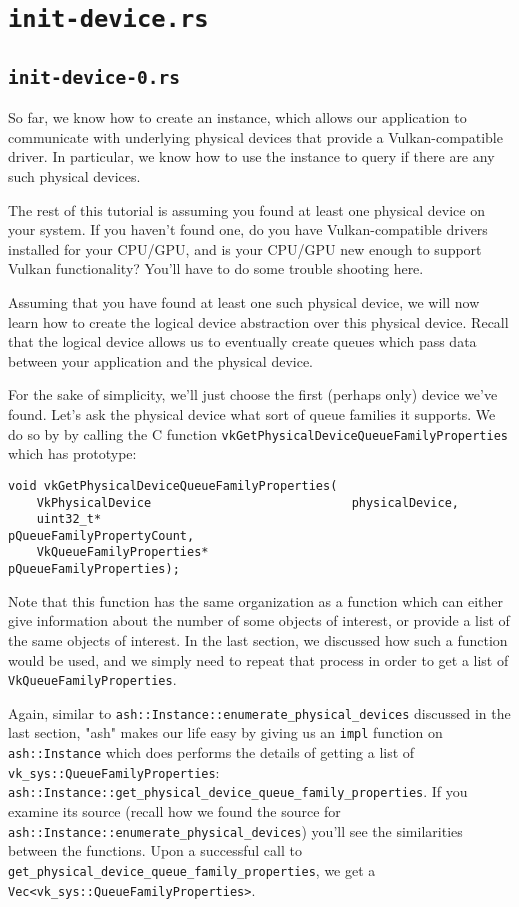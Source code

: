 \documentclass[12pt,letterpaper]{article}
\newcommand{\ril}[1]{\texttt{#1}}
\newcommand{\cil}[1]{\texttt{#1}}
\begin{document}
\section{\texttt{init-device.rs}}
	
	\subsection{\texttt{init-device-0.rs}}
		So far, we know how to create an instance, which allows our application to communicate with underlying physical devices that provide a Vulkan-compatible driver. In particular, we know how to use the instance to query if there are any such physical devices. 
		
		The rest of this tutorial is assuming you found at least one physical device on your system. If you haven't found one, do you have Vulkan-compatible drivers installed for your CPU/GPU, and is your CPU/GPU new enough to support Vulkan functionality? You'll have to do some trouble shooting here. 
		
		Assuming that you have found at least one such physical device, we will now learn how to create the logical device abstraction over this physical device. Recall that the logical device allows us to eventually create queues which pass data between your application and the physical device. 
		
		For the sake of simplicity, we'll just choose the first (perhaps only) device we've found. Let's ask the physical device what sort of queue families it supports. We do so by by calling the C function \cil{vkGetPhysicalDeviceQueueFamilyProperties} which has prototype:
			\begin{verbatim}
void vkGetPhysicalDeviceQueueFamilyProperties(
	VkPhysicalDevice                            physicalDevice,
	uint32_t*                                   pQueueFamilyPropertyCount,
	VkQueueFamilyProperties*                    pQueueFamilyProperties);
			\end{verbatim}
		Note that this function has the same organization as a function which can either give information about the number of some objects of interest, or provide a list of the same objects of interest. In the last section, we discussed how such a function would be used, and we simply need to repeat that process in order to get a list of \cil{VkQueueFamilyProperties}.
		
		Again, similar to \ril{ash::Instance::enumerate_physical_devices} discussed in the last section, "ash" makes our life easy by giving us an \ril{impl} function on \ril{ash::Instance} which does performs the details of getting a list of \ril{vk_sys::QueueFamilyProperties}: \ril{ash::Instance::get_physical_device_queue_family_properties}. If you examine its source (recall how we found the source for \ril{ash::Instance::enumerate_physical_devices}) you'll see the similarities between the functions. Upon a successful call to \cil{get_physical_device_queue_family_properties}, we get a \ril{Vec<vk_sys::QueueFamilyProperties>}.
		
\end{document}
